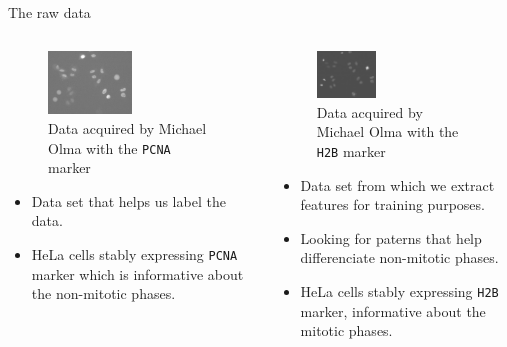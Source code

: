 \documentclass{beamer}
\begin{document}
\begin{frame}{The raw data}
\begin{columns}[T] %
\begin{column}{.40\textwidth}
\begin{footnotesize}
\begin{figure}[!ht]
\centering
\includegraphics[width=0.50\textwidth]{Images/PCNA.png}
\caption{Data acquired by Michael Olma with the \texttt{PCNA} marker}
\label{PCNA_michael_olma}
\end{figure}
\begin{itemize}
\item Data set that helps us label the data.
\item HeLa cells stably expressing \texttt{PCNA} marker which is informative about the non-mitotic phases.
\end{itemize}
\end{footnotesize}
\end{column}%
\hfill%
\begin{column}{.56\textwidth}
\begin{footnotesize}
\begin{figure}[!ht]
\centering
\includegraphics[width=0.38\textwidth]{Images/H2B.png}
\caption{Data acquired by Michael Olma with the \texttt{H2B} marker}
\label{H2B}
\end{figure}
\begin{itemize}
\item Data set from which we extract features for training purposes. 
\item Looking for paterns that help differenciate non-mitotic phases.
\item HeLa cells stably expressing \texttt{H2B} marker, informative about the mitotic phases.
\end{itemize}
\end{footnotesize}
\end{column}%
\end{columns}
\end{frame}
\end{document}
